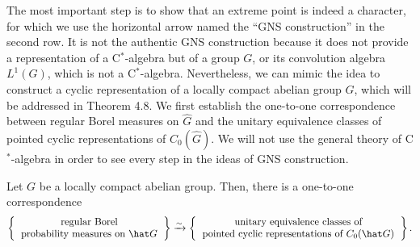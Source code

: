 \documentclass{../../small}
\begin{document}
The most important step is to show that an extreme point is indeed a character, for which we use the horizontal arrow named the ``GNS construction'' in the second row.
It is not the authentic GNS construction because it does not provide a representation of a C$^*$-algebra but of a group $G$, or its convolution algebra $L^1(G)$, which is not a C$^*$-algebra.
Nevertheless, we can mimic the idea to construct a cyclic representation of a locally compact abelian group $G$, which will be addressed in Theorem 4.8.
We first establish the one-to-one correspondence between regular Borel measures on $\hat G$ and the unitary equivalence classes of pointed cyclic representations of $C_0(\hat G)$.
We will not use the general theory of C$^*$-algebra in order to see every step in the ideas of GNS construction.

\begin{thm}
Let $G$ be a locally compact abelian group.
Then, there is a one-to-one correspondence
\[\left\{\begin{tabular}{c}regular Borel\\probability measures on $\hat G$\end{tabular}\right\}\xrightarrow{\sim}\left\{\begin{tabular}{c}unitary equivalence classes of\\pointed cyclic representations of $C_0(\hat G)$\end{tabular}\right\}.\]
\end{thm}
\end{document}
